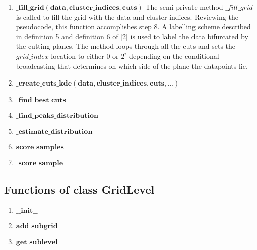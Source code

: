 \begin{enumerate}
    \item $\mathbf{\_fill\_grid(data, cluster\_indices,cuts)}$\newline
    {The semi-private method $\_fill\_grid$ is called to fill the grid with the data and cluster indices. Reviewing the pseudocode, this function accomplishes step 8. 
    A labelling scheme described in definition 5 and definition 6 of [2] is used to label the data bifurcated by the cutting planes. 
    The method loops through all the cuts and sets the $grid\_index$ location to either 0 or ${2^i}$ depending on the conditional broadcasting that determines on which side of the plane the datapoints lie.}
    \item $\mathbf{\_create\_cuts\_kde(data, cluster\_indices,cuts,  ... )}$\newline
    {}
    \item $\mathbf{\_find\_best\_cuts}$\newline
    {}
    \item $\mathbf{\_find\_peaks\_distribution}$\newline
    {}
    \item $\mathbf{\_estimate\_distribution}$\newline
    {}
    \item $\mathbf{score\_samples}$\newline
    {}
    \item $\mathbf{\_score\_sample}$\newline
    {}
\end{enumerate}

\subsection{Functions of class GridLevel}
\begin{enumerate}    
    \item $\mathbf{\_\_init\_\_}$\newline
    {}
    \item $\mathbf{add\_subgrid}$\newline
    {}
    \item $\mathbf{get\_sublevel}$\newline
    {}
\end{enumerate}


